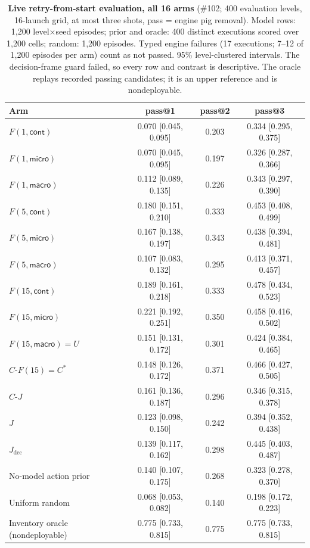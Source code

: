 \begin{table}[h]
\begin{revblock}
\centering
\footnotesize
\caption{\textbf{Live retry-from-start evaluation, all 16 arms} (\#102; 400 evaluation levels, 16-launch grid, at most three shots, pass = engine pig removal). Model rows: 1,200 level$\times$seed episodes; prior and oracle: 400 distinct executions scored over 1,200 cells; random: 1,200 episodes. Typed engine failures (17 executions; 7--12 of 1,200 episodes per arm) count as not passed. 95\% level-clustered intervals. The decision-frame guard failed, so every row and contrast is descriptive. The oracle replays recorded passing candidates; it is an upper reference and is nondeployable.}
\label{tab:app:res:live}
\begin{tabular}{@{}lccc@{}}
\toprule
Arm & pass@1 & pass@2 & pass@3 \\
\midrule
$F(1,\textsf{cont})$ & 0.070 [0.045, 0.095] & 0.203 & 0.334 [0.295, 0.375] \\
$F(1,\textsf{micro})$ & 0.070 [0.045, 0.095] & 0.197 & 0.326 [0.287, 0.366] \\
$F(1,\textsf{macro})$ & 0.112 [0.089, 0.135] & 0.226 & 0.343 [0.297, 0.390] \\
$F(5,\textsf{cont})$ & 0.180 [0.151, 0.210] & 0.333 & 0.453 [0.408, 0.499] \\
$F(5,\textsf{micro})$ & 0.167 [0.138, 0.197] & 0.343 & 0.438 [0.394, 0.481] \\
$F(5,\textsf{macro})$ & 0.107 [0.083, 0.132] & 0.295 & 0.413 [0.371, 0.457] \\
$F(15,\textsf{cont})$ & 0.189 [0.161, 0.218] & 0.333 & 0.478 [0.434, 0.523] \\
$F(15,\textsf{micro})$ & 0.221 [0.192, 0.251] & 0.350 & 0.458 [0.416, 0.502] \\
$F(15,\textsf{macro})=U$ & 0.151 [0.131, 0.172] & 0.301 & 0.424 [0.384, 0.465] \\
$C\text{-}F(15)=C^{*}$ & 0.148 [0.126, 0.172] & 0.371 & 0.466 [0.427, 0.505] \\
$C\text{-}J$ & 0.161 [0.136, 0.187] & 0.296 & 0.346 [0.315, 0.378] \\
$J$ & 0.123 [0.098, 0.150] & 0.242 & 0.394 [0.352, 0.438] \\
$J_{\mathrm{dec}}$ & 0.139 [0.117, 0.162] & 0.298 & 0.445 [0.403, 0.487] \\
No-model action prior & 0.140 [0.107, 0.175] & 0.268 & 0.323 [0.278, 0.370] \\
Uniform random & 0.068 [0.053, 0.082] & 0.140 & 0.198 [0.172, 0.223] \\
Inventory oracle (nondeployable) & 0.775 [0.733, 0.815] & 0.775 & 0.775 [0.733, 0.815] \\
\bottomrule
\end{tabular}
\end{revblock}
\end{table}

